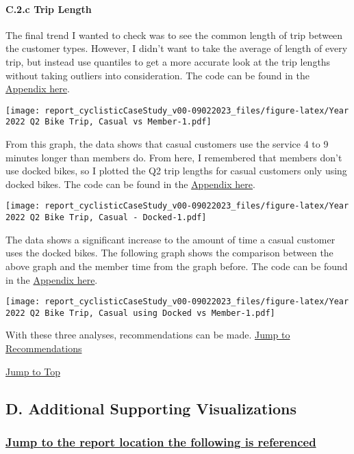 \documentclass[
]{article}
\begin{document}
\hypertarget{c.2.c-trip-length}{%
\paragraph{C.2.c Trip Length}\label{c.2.c-trip-length}}

The final trend I wanted to check was to see the common length of trip
between the customer types. However, I didn't want to take the average
of length of every trip, but instead use quantiles to get a more
accurate look at the trip lengths without taking outliers into
consideration. The code can be found in the
\protect\hyperlink{Appx5}{Appendix here}.

\texttt{[image: report\_cyclisticCaseStudy\_v00-09022023\_files/figure-latex/Year 2022 Q2 Bike Trip, Casual vs Member-1.pdf]}

From this graph, the data shows that casual customers use the service 4
to 9 minutes longer than members do. From here, I remembered that
members don't use docked bikes, so I plotted the Q2 trip lengths for
casual customers only using docked bikes. The code can be found in the
\protect\hyperlink{Appx6}{Appendix here}.

\texttt{[image: report\_cyclisticCaseStudy\_v00-09022023\_files/figure-latex/Year 2022 Q2 Bike Trip, Casual - Docked-1.pdf]}

The data shows a significant increase to the amount of time a casual
customer uses the docked bikes. The following graph shows the comparison
between the above graph and the member time from the graph before. The
code can be found in the \protect\hyperlink{Appx7}{Appendix here}.

\texttt{[image: report\_cyclisticCaseStudy\_v00-09022023\_files/figure-latex/Year 2022 Q2 Bike Trip, Casual using Docked vs Member-1.pdf]}

With these three analyses, recommendations can be made.
\protect\hyperlink{ptE}{Jump to Recommendations}

\protect\hyperlink{toc}{Jump to Top}

\hypertarget{d.-additional-supporting-visualizations}{%
\subsection{D. Additional Supporting
Visualizations}\label{d.-additional-supporting-visualizations}}

\hypertarget{jump-to-the-report-location-the-following-is-referenced}{%
\subsubsection{\texorpdfstring{ \protect\hyperlink{VizRef1}{Jump to the
report location the following is
referenced}}{ Jump to the report location the following is referenced}}\label{jump-to-the-report-location-the-following-is-referenced}}
\end{document}
